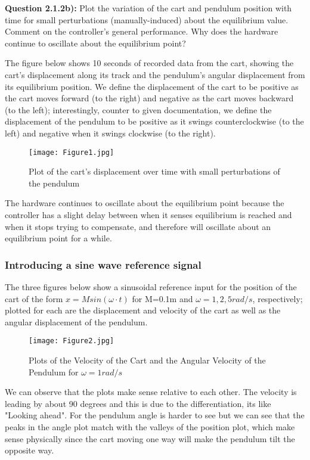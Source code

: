 \documentclass[11pt, twoside, letterpaper]{article}   	%
\begin{document}
\textbf{Question 2.1.2b):} Plot the variation of the cart and pendulum position with time for small perturbations (manually-induced) about the equilibrium value. Comment on the controller's general performance. Why does the hardware continue to oscillate about the equilibrium point?

The figure below shows 10 seconds of recorded data from the cart, showing the cart's displacement along its track and the pendulum's angular displacement from its equilibrium position. We define the displacement of the cart to be positive as the cart moves forward (to the right) and negative as the cart moves backward (to the left); interestingly, counter to given documentation, we define the displacement of the pendulum to be positive as it swings counterclockwise (to the left) and negative when it swings clockwise (to the right). 

\begin{figure}[htbp]
\begin{center}
\texttt{[image: Figure1.jpg]}
\caption{Plot of the cart's displacement over time with small perturbations of the pendulum}
\label{default}
\end{center}
\end{figure}
\FloatBarrier

The hardware continues to oscillate about the equilibrium point because the controller has a slight delay between when it senses equilibrium is reached and when it stops trying to compensate, and therefore will oscillate about an equilibrium point for a while.

\subsubsection{Introducing a sine wave reference signal}
The three figures below show a sinusoidal reference input for the position of the cart of the form
$x=Msin(\omega \cdot t)$
for M=0.1m and $\omega = 1,2,5rad/s$, respectively; plotted for each are the displacement and velocity of the cart as well as the angular displacement of the pendulum.

\begin{figure}[htbp]
\begin{center}
\texttt{[image: Figure2.jpg]}
\caption{Plots of the Velocity of the Cart and the Angular Velocity of the Pendulum for $\omega = 1 rad/s$}
\label{default}
\end{center}
\end{figure}
\FloatBarrier
We can observe that the plots make sense relative to each other. The velocity is leading by about 90 degrees
and this is due to the differentiation, its like "Looking ahead". For the pendulum angle is harder to see
but we can see that the peaks in the angle plot match with the valleys of the position plot, which make sense
physically since the cart moving one way will make the pendulum tilt the opposite way.
\end{document}
